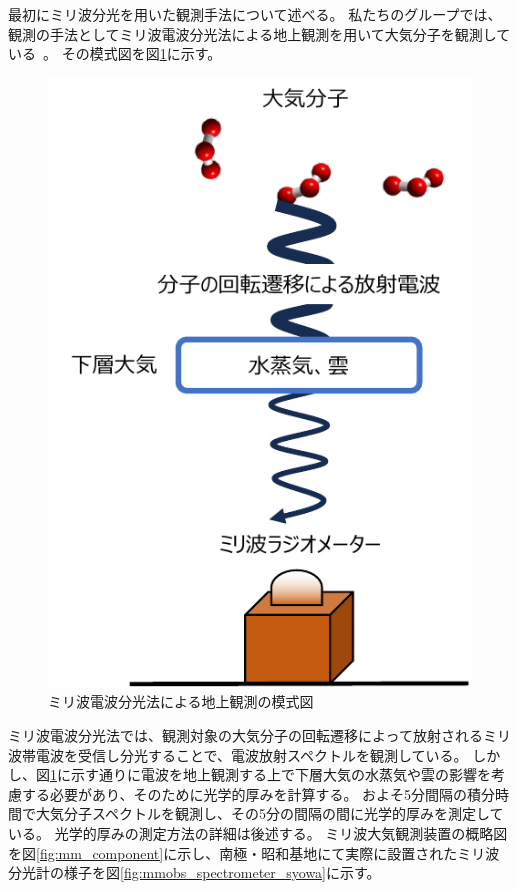 最初にミリ波分光を用いた観測手法について述べる。
私たちのグループでは、観測の手法としてミリ波電波分光法による地上観測を用いて大気分子を観測している~\cite{mizuno2002millimeter}。
その模式図を図\ref{fig:spectrometer_schema}に示す。
\begin{figure}[htbp]
    \centering
    \includegraphics{master_thesis_contents/master_thesis_fig/spectrometer_schema.pdf}
    \caption{ミリ波電波分光法による地上観測の模式図}
    \label{fig:spectrometer_schema}
\end{figure}
ミリ波電波分光法では、観測対象の大気分子の回転遷移によって放射されるミリ波帯電波を受信し分光することで、電波放射スペクトルを観測している。
しかし、図\ref{fig:spectrometer_schema}に示す通りに電波を地上観測する上で下層大気の水蒸気や雲の影響を考慮する必要があり、そのために光学的厚みを計算する。
およそ5分間隔の積分時間で大気分子スペクトルを観測し、その5分の間隔の間に光学的厚みを測定している。
光学的厚みの測定方法の詳細は後述する。
ミリ波大気観測装置の概略図を図\ref{fig:mm_component}に示し、南極・昭和基地にて実際に設置されたミリ波分光計の様子を図\ref{fig:mmobs_spectrometer_syowa}に示す。
